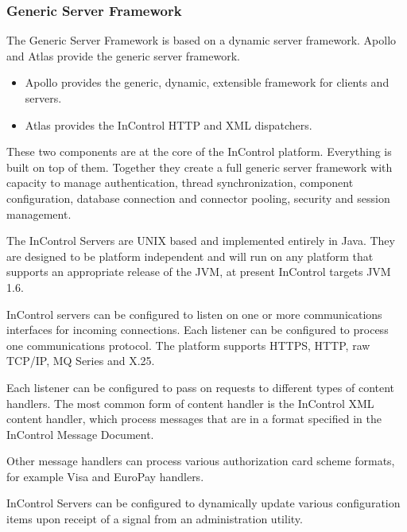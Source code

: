 \documentclass[a4paper, 11pt, titlepage]{article}
\begin{document}
\subsubsection{Generic Server Framework} 
The Generic Server Framework is based on a dynamic server framework. Apollo and Atlas provide the generic server framework. 
\begin{itemize} 
\item Apollo provides the generic, dynamic, extensible framework for clients and servers. 
\item Atlas provides the InControl HTTP and XML dispatchers. 
\end{itemize} 
These two components are at the core of the InControl platform. Everything is built on top of them. Together they create a full generic server framework with capacity to manage authentication, thread synchronization, component configuration, database connection and connector pooling, security and session management.
 
The InControl Servers are UNIX based and implemented entirely in Java. They are designed to be platform independent and will run on any platform that supports an appropriate release of the JVM, at present InControl targets JVM 1.6. 
 
InControl servers can be configured to listen on one or more communications interfaces for incoming connections. Each listener can be configured to process one communications protocol. The platform supports HTTPS, HTTP, raw TCP/IP, MQ Series and X.25. 
 
Each listener can be configured to pass on requests to different types of content handlers. The most common form of content handler is the InControl XML content handler, which process messages that are in a format specified in the InControl Message Document.
 
Other message handlers can process various authorization card scheme formats, for example Visa and EuroPay handlers. 
 
InControl Servers can be configured to dynamically update various configuration items upon receipt of a signal from an administration utility. 
 
\end{document}
